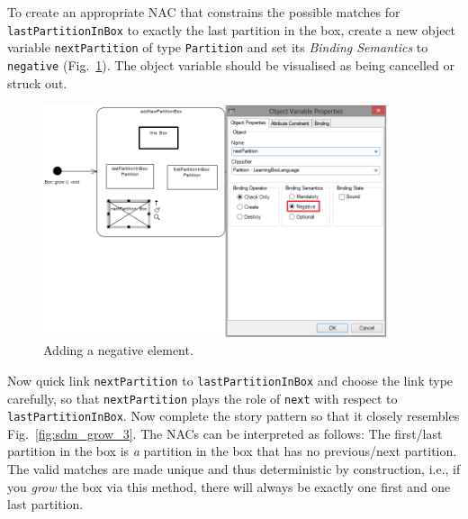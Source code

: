To create an appropriate \mbox{NAC} that constrains the possible matches for
\texttt{lastPartitionInBox} to exactly the last partition in the box, create a
new object variable \texttt{nextPartition} of type \texttt{Partition} and set
its \emph{Binding Semantics} to \texttt{negative} (Fig.~\ref{fig:sdm_grow_2}).  
The object variable should be visualised as being cancelled or struck out.
 
\begin{figure}[htbp]
\begin{center}
  \includegraphics[width=0.9\textwidth]{pics/sdmBilder/grow/sdm58RAW.png}
  \caption{Adding a negative element.}  
  \label{fig:sdm_grow_2}
\end{center}
\end{figure}
 
Now quick link \texttt{nextPartition} to \texttt{lastPartitionInBox} and choose
the link type carefully, so that \texttt{nextPartition} plays the role of
\texttt{next} with respect to \texttt{lastPartitionInBox}.  Now complete the
story pattern so that it closely resembles Fig.~\ref{fig:sdm_grow_3}.  The
\mbox{NACs} can be interpreted as follows:  The first/last partition in the box
is \emph{a} partition in the box that has no previous/next partition.  The
valid matches are made unique and thus deterministic by construction, i.e., if
you \emph{grow} the box via this method, there will always be exactly one first
and one last partition.  

